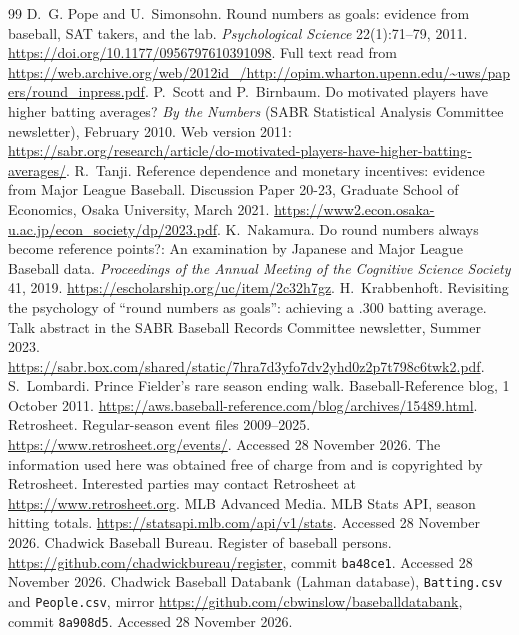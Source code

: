 \documentclass[11pt]{article}
\begin{document}
\begin{thebibliography}{99}
 D.~G. Pope and U.~Simonsohn. Round numbers as goals: evidence from baseball, SAT takers, and the lab. \emph{Psychological Science} 22(1):71--79, 2011. \url{https://doi.org/10.1177/0956797610391098}. Full text read from \url{https://web.archive.org/web/2012id_/http://opim.wharton.upenn.edu/~uws/papers/round_inpress.pdf}.
 P.~Scott and P.~Birnbaum. Do motivated players have higher batting averages? \emph{By the Numbers} (SABR Statistical Analysis Committee newsletter), February 2010. Web version 2011: \url{https://sabr.org/research/article/do-motivated-players-have-higher-batting-averages/}.
 R.~Tanji. Reference dependence and monetary incentives: evidence from Major League Baseball. Discussion Paper 20-23, Graduate School of Economics, Osaka University, March 2021. \url{https://www2.econ.osaka-u.ac.jp/econ_society/dp/2023.pdf}.
 K.~Nakamura. Do round numbers always become reference points?: An examination by Japanese and Major League Baseball data. \emph{Proceedings of the Annual Meeting of the Cognitive Science Society} 41, 2019. \url{https://escholarship.org/uc/item/2c32h7gz}.
 H.~Krabbenhoft. Revisiting the psychology of ``round numbers as goals'': achieving a .300 batting average. Talk abstract in the SABR Baseball Records Committee newsletter, Summer 2023. \url{https://sabr.box.com/shared/static/7hra7d3yfo7dv2yhd0z2p7t798c6twk2.pdf}.
 S.~Lombardi. Prince Fielder's rare season ending walk. Baseball-Reference blog, 1 October 2011. \url{https://aws.baseball-reference.com/blog/archives/15489.html}.
 Retrosheet. Regular-season event files 2009--2025. \url{https://www.retrosheet.org/events/}. Accessed 28 November 2026. The information used here was obtained free of charge from and is copyrighted by Retrosheet. Interested parties may contact Retrosheet at \url{https://www.retrosheet.org}.
 MLB Advanced Media. MLB Stats API, season hitting totals. \url{https://statsapi.mlb.com/api/v1/stats}. Accessed 28 November 2026.
 Chadwick Baseball Bureau. Register of baseball persons. \url{https://github.com/chadwickbureau/register}, commit \texttt{ba48ce1}. Accessed 28 November 2026.
 Chadwick Baseball Databank (Lahman database), \texttt{Batting.csv} and \texttt{People.csv}, mirror \url{https://github.com/cbwinslow/baseballdatabank}, commit \texttt{8a908d5}. Accessed 28 November 2026.
\end{thebibliography}
\end{document}
